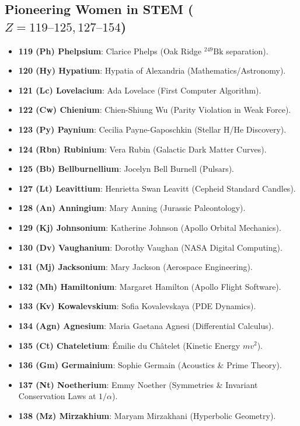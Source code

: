\documentclass[10pt,twocolumn,a4paper]{article}
\begin{document}
\subsection{\texorpdfstring{Pioneering Women in STEM ($Z = 119\text{--}125, 127\text{--}154$)}{Pioneering Women in STEM (Z = 119-125, 127-154)}}
\begin{itemize}\itemsep=1pt
\item \textbf{119 (Ph) Phelpsium}: Clarice Phelps (Oak Ridge $^{249}\text{Bk}$ separation).
\item \textbf{120 (Hy) Hypatium}: Hypatia of Alexandria (Mathematics/Astronomy).
\item \textbf{121 (Lc) Lovelacium}: Ada Lovelace (First Computer Algorithm).
\item \textbf{122 (Cw) Chienium}: Chien-Shiung Wu (Parity Violation in Weak Force).
\item \textbf{123 (Py) Paynium}: Cecilia Payne-Gaposchkin (Stellar H/He Discovery).
\item \textbf{124 (Rbn) Rubinium}: Vera Rubin (Galactic Dark Matter Curves).
\item \textbf{125 (Bb) Bellburnellium}: Jocelyn Bell Burnell (Pulsars).
\item \textbf{127 (Lt) Leavittium}: Henrietta Swan Leavitt (Cepheid Standard Candles).
\item \textbf{128 (An) Anningium}: Mary Anning (Jurassic Paleontology).
\item \textbf{129 (Kj) Johnsonium}: Katherine Johnson (Apollo Orbital Mechanics).
\item \textbf{130 (Dv) Vaughanium}: Dorothy Vaughan (NASA Digital Computing).
\item \textbf{131 (Mj) Jacksonium}: Mary Jackson (Aerospace Engineering).
\item \textbf{132 (Mh) Hamiltonium}: Margaret Hamilton (Apollo Flight Software).
\item \textbf{133 (Kv) Kowalevskium}: Sofia Kovalevskaya (PDE Dynamics).
\item \textbf{134 (Agn) Agnesium}: Maria Gaetana Agnesi (Differential Calculus).
\item \textbf{135 (Ct) Chateletium}: Émilie du Châtelet (Kinetic Energy $mv^2$).
\item \textbf{136 (Gm) Germainium}: Sophie Germain (Acoustics \& Prime Theory).
\item \textbf{137 (Nt) Noetherium}: Emmy Noether (Symmetries \& Invariant Conservation Laws at $1/\alpha$).
\item \textbf{138 (Mz) Mirzakhium}: Maryam Mirzakhani (Hyperbolic Geometry).

\end{itemize}
\end{document}
